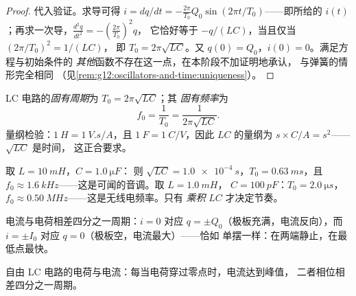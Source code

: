 \begin{proof}
代入验证。求导可得
$i = dq/dt = -\frac{2\pi}{T_0} Q_0 \sin(2\pi t/T_0)$——即所给的
$i(t)$；再求一次导，$\frac{d^2q}{dt^2} = -(\frac{2\pi}{T_0})^2 q$，
它恰好等于 $-q/(LC)$，当且仅当 $(2\pi/T_0)^2 = 1/(LC)$，
即 $T_0 = 2\pi\sqrt{LC}$。又 $q(0) = Q_0$，$i(0) = 0$。满足方程与初始条件的
\emph{其他}函数不存在这一点，在本阶段不加证明地承认，
与弹簧的情形完全相同
（见\cref{rem:g12:oscillators-and-time:uniqueness}）。
\end{proof}

\begin{definition}[固有周期与频率]\label{def:g12:rlc-oscillations:period}
LC 电路的\emph{固有周期}为
$T_0 = 2\pi\sqrt{LC}$；其
\emph{固有频率}为
\[
f_0 = \frac{1}{T_0} = \frac{1}{2\pi\sqrt{LC}} .
\]
量纲检验：$\qty{1}{H} = \qty{1}{V.s/A}$，且
$\qty{1}{F} = \qty{1}{C/V}$，因此 $LC$ 的量纲为
$\unit{s} \times \unit{C/A} = \unit{s^2}$——$\sqrt{LC}$ 是时间，
这正合要求。
\end{definition}

\begin{example}[几个数值]\label{ex:g12:rlc-oscillations:firstnumbers}
取 $L = \qty{10}{mH}$，$C = \qty{1.0}{\micro F}$：
则 $\sqrt{LC} = \qty{1.0e-4}{s}$，$T_0 = \qty{0.63}{ms}$，且
$f_0 \approx \qty{1.6}{kHz}$——这是可闻的音调。取 $L = \qty{1.0}{mH}$，
$C = \qty{100}{pF}$：$T_0 = \qty{2.0}{\micro s}$，
$f_0 \approx \qty{0.50}{MHz}$——这是无线电频率。只有
\emph{乘积} $LC$ 才决定节奏。
\end{example}

\begin{remark}[相差四分之一周期]\label{rem:g12:rlc-oscillations:quarter}
电流与电荷相差四分之一周期：$i = 0$
对应 $q = \pm Q_0$（极板充满，电流反向），而 $i = \pm I_0$
对应 $q = 0$（极板空，电流最大）——恰如
单摆一样：在两端静止，在最低点最快。
\end{remark}

\begin{omfigure}

{\small 自由 LC 电路的电荷与电流：每当电荷穿过零点时，电流达到峰值，
二者相位相差四分之一周期。}
\end{omfigure}

